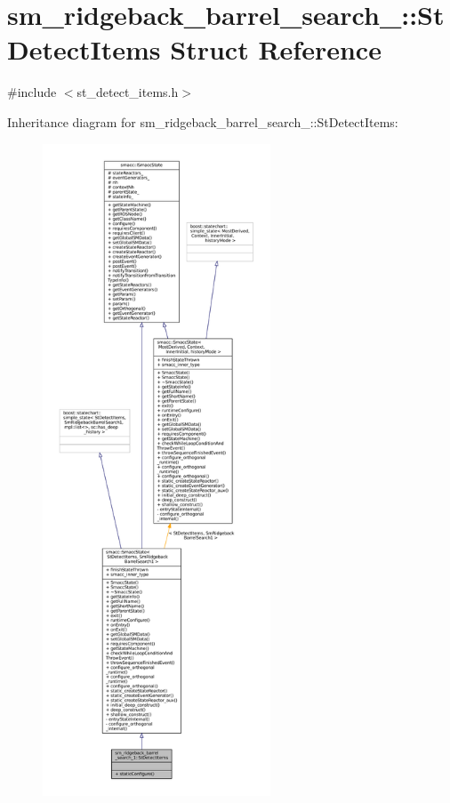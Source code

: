 \hypertarget{structsm__ridgeback__barrel__search__1_1_1StDetectItems}{}\section{sm\+\_\+ridgeback\+\_\+barrel\+\_\+search\+\_\+:\+:St\+Detect\+Items Struct Reference}
\label{structsm__ridgeback__barrel__search__1_1_1StDetectItems}


{\ttfamily \#include $<$st\+\_\+detect\+\_\+items.\+h$>$}



Inheritance diagram for sm\+\_\+ridgeback\+\_\+barrel\+\_\+search\+\_\+:\+:St\+Detect\+Items\+:
\nopagebreak
\begin{figure}[H]
\begin{center}
\leavevmode
\includegraphics[height=550pt]{structsm__ridgeback__barrel__search__1_1_1StDetectItems__inherit__graph}
\end{center}
\end{figure}


